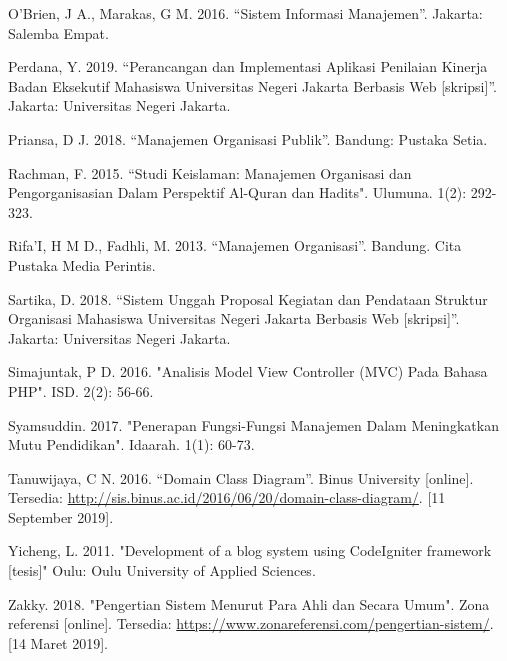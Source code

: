 \documentclass{jtetiskripsi}
\begin{document}
\begin{thebibliography}{99}
	 O’Brien, J A., Marakas, G M. 2016. “Sistem Informasi Manajemen”. Jakarta: Salemba Empat.
	
	 Perdana, Y. 2019. “Perancangan dan Implementasi Aplikasi Penilaian Kinerja Badan Eksekutif Mahasiswa Universitas Negeri Jakarta Berbasis Web [skripsi]”. Jakarta: Universitas Negeri Jakarta.
	
	 Priansa, D J. 2018. “Manajemen Organisasi Publik”. Bandung: Pustaka Setia.
	
	 Rachman, F. 2015. “Studi Keislaman: Manajemen Organisasi dan Pengorganisasian Dalam Perspektif Al-Quran dan Hadits". Ulumuna. 1(2): 292-323.
	
	
	 Rifa’I, H M D., Fadhli, M. 2013. “Manajemen Organisasi”. Bandung. Cita Pustaka Media Perintis.
	
	 Sartika, D. 2018. “Sistem Unggah Proposal Kegiatan dan Pendataan Struktur Organisasi Mahasiswa Universitas Negeri Jakarta Berbasis Web [skripsi]”. Jakarta: Universitas Negeri Jakarta.
	
	 Simajuntak, P D. 2016. "Analisis Model View Controller (MVC) Pada Bahasa PHP". ISD. 2(2): 56-66. 
	
	 Syamsuddin. 2017. "Penerapan Fungsi-Fungsi Manajemen Dalam Meningkatkan Mutu Pendidikan". Idaarah. 1(1): 60-73.
	
	 Tanuwijaya, C N. 2016. “Domain Class Diagram”. Binus University [online]. Tersedia: \url{http://sis.binus.ac.id/2016/06/20/domain-class-diagram/}. [11 September 2019].
	
	 Yicheng, L. 2011. "Development of a blog system using CodeIgniter framework [tesis]" Oulu: Oulu University of Applied Sciences.
	
	 Zakky. 2018. "Pengertian Sistem Menurut Para Ahli dan Secara Umum". Zona referensi [online]. Tersedia: \url{https://www.zonareferensi.com/pengertian-sistem/}. [14 Maret 2019]. 
		
	
\end{thebibliography}



%

%
\end{document}
